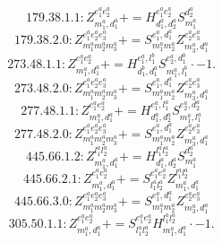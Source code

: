 \documentclass[letterpaper,10pt,fleqn,leqno,onecolumn]{article}
\begin{document}
\begin{equation} \;\;\;\;\;\;  179.38.1.1: Z^{e_{1}^{a}e_{2}^{a}}_{m_{1}^{a},d_{1}^{a}}+=H^{e_{1}^{a}e_{2}^{a}}_{d_{1}^{a},d_{2}^{a}}S^{d_{2}^{a}}_{m_{1}^{a}} \end{equation}
\begin{equation} \;\;\;\;\;\;  179.38.2.0: Z^{e_{1}^{a}e_{2}^{a}e_{3}^{a}}_{m_{1}^{a}m_{2}^{a}m_{3}^{a}}+=S^{e_{1}^{a},d_{1}^{a}}_{m_{1}^{a}m_{2}^{a}}Z^{e_{2}^{a}e_{3}^{a}}_{m_{3}^{a},d_{1}^{a}} \end{equation}
\begin{equation} \;\;\;\;\;\;  273.48.1.1: Z^{e_{1}^{a}e_{2}^{a}}_{m_{1}^{a},d_{1}^{a}}+=H^{e_{1}^{a},l_{1}^{b}}_{d_{1}^{b},d_{1}^{a}}S^{e_{2}^{a},d_{1}^{b}}_{m_{1}^{a},l_{1}^{b}}\cdot -1. \end{equation}
\begin{equation} \;\;\;\;\;\;  273.48.2.0: Z^{e_{1}^{a}e_{2}^{a}e_{3}^{a}}_{m_{1}^{a}m_{2}^{a}m_{3}^{a}}+=S^{e_{1}^{a},d_{1}^{a}}_{m_{1}^{a}m_{2}^{a}}Z^{e_{2}^{a}e_{3}^{a}}_{m_{3}^{a},d_{1}^{a}} \end{equation}
\begin{equation} \;\;\;\;\;\;  277.48.1.1: Z^{e_{1}^{a}e_{2}^{a}}_{m_{1}^{a},d_{1}^{a}}+=H^{e_{1}^{a},l_{1}^{a}}_{d_{1}^{a},d_{2}^{a}}S^{e_{2}^{a},d_{2}^{a}}_{m_{1}^{a},l_{1}^{a}} \end{equation}
\begin{equation} \;\;\;\;\;\;  277.48.2.0: Z^{e_{1}^{a}e_{2}^{a}e_{3}^{a}}_{m_{1}^{a}m_{2}^{a}m_{3}^{a}}+=S^{e_{1}^{a},d_{1}^{a}}_{m_{1}^{a}m_{2}^{a}}Z^{e_{2}^{a}e_{3}^{a}}_{m_{3}^{a},d_{1}^{a}} \end{equation}
\begin{equation} \;\;\;\;\;\;  445.66.1.2: Z^{l_{1}^{a}l_{2}^{a}}_{m_{1}^{a},d_{1}^{a}}+=H^{l_{1}^{a}l_{2}^{a}}_{d_{1}^{a},d_{2}^{a}}S^{d_{2}^{a}}_{m_{1}^{a}} \end{equation}
\begin{equation} \;\;\;\;\;\;  445.66.2.1: Z^{e_{1}^{a}e_{2}^{a}}_{m_{1}^{a},d_{1}^{a}}+=S^{e_{1}^{a}e_{2}^{a}}_{l_{1}^{a}l_{2}^{a}}Z^{l_{1}^{a}l_{2}^{a}}_{m_{1}^{a},d_{1}^{a}} \end{equation}
\begin{equation} \;\;\;\;\;\;  445.66.3.0: Z^{e_{1}^{a}e_{2}^{a}e_{3}^{a}}_{m_{1}^{a}m_{2}^{a}m_{3}^{a}}+=S^{e_{1}^{a},d_{1}^{a}}_{m_{1}^{a}m_{2}^{a}}Z^{e_{2}^{a}e_{3}^{a}}_{m_{3}^{a},d_{1}^{a}} \end{equation}
\begin{equation} \;\;\;\;\;\;  305.50.1.1: Z^{e_{1}^{a}e_{2}^{a}}_{m_{1}^{a},d_{1}^{a}}+=S^{e_{1}^{a}e_{2}^{a}}_{l_{1}^{a}l_{2}^{a}}H^{l_{1}^{a}l_{2}^{a}}_{m_{1}^{a},d_{1}^{a}}\cdot -1. \end{equation}
\end{document}
